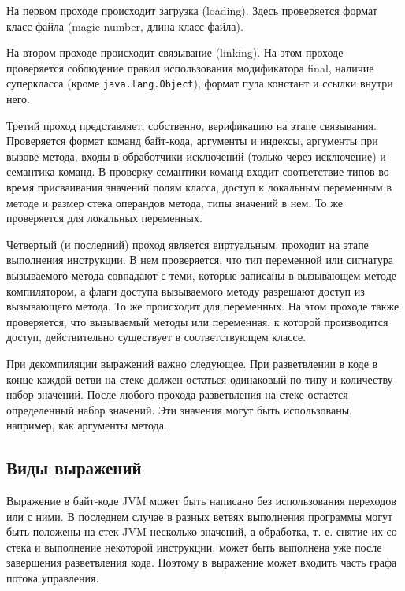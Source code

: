 На первом проходе происходит загрузка (loading). Здесь проверяется формат класс-файла (magic number, длина класс-файла).

На втором проходе происходит связывание (linking). На этом проходе проверяется соблюдение правил использования модификатора final, наличие суперкласса (кроме \texttt{java.lang.Object}), формат пула констант и ссылки внутри него.

Третий проход представляет, собственно, верификацию на этапе связывания. Проверяется формат команд байт-кода, аргументы и индексы, аргументы при вызове метода, входы в обработчики исключений (только через исключение) и семантика команд. В проверку семантики команд входит соответствие типов во время присваивания значений полям класса, доступ к локальным переменным в методе и размер стека операндов метода, типы значений в нем. То же проверяется для локальных переменных.

Четвертый (и последний) проход является виртуальным, проходит на этапе выполнения инструкции. В нем проверяется, что тип переменной или сигнатура вызываемого метода совпадают с теми, которые записаны в вызывающем методе компилятором, а флаги доступа вызываемого методу разрешают доступ из вызывающего метода. То же происходит для переменных. На этом проходе также проверяется, что вызываемый методы или переменная, к которой производится доступ, действительно существует в соответствующем классе.

При декомпиляции выражений важно следующее. При разветвлении в коде в конце каждой ветви на стеке должен остаться одинаковый по типу и количеству набор значений. После любого прохода разветвления на стеке остается определенный набор значений. Эти значения могут быть использованы, например, как аргументы метода.




\subsection{Виды выражений}
Выражение в байт-коде JVM может быть написано без использования переходов или с ними. В последнем случае в разных ветвях выполнения программы могут быть положены на стек JVM несколько значений, а обработка, т. е. снятие их со стека и выполнение некоторой инструкции, может быть выполнена уже после завершения разветвления кода. Поэтому в выражение может входить часть графа потока управления.

